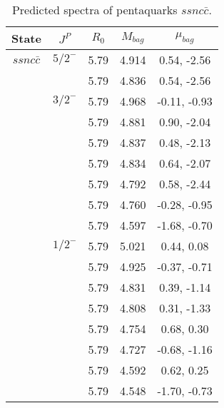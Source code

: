 \documentclass[prd,twocolumn,floatfix,nofootinbib]{revtex4}
\begin{document}
\renewcommand{\tabcolsep}{0.5cm}
\renewcommand{\arraystretch}{1.2}
\begin{table*}[!htbp]
    \caption{Predicted spectra of pentaquarks $ssnc\bar{c}$.}
    \begin{tabular}{ccccc}
        \hline\hline
        {\rm State} &$J^{P}$ &$R_{0}$ &$M_{bag}$ &$\mu_{bag}$ \\ \hline
        $ssnc\bar{c}$
            &${5/2}^{-}$    &5.79   &4.914 &0.54, -2.56\\
            &               &5.79   &4.836 &0.54, -2.56  \\
            &${3/2}^{-}$    &5.79   &4.968 &-0.11, -0.93  \\
            &               &5.79   &4.881 &0.90, -2.04  \\
            &               &5.79   &4.837 &0.48, -2.13  \\
            &               &5.79   &4.834 &0.64, -2.07  \\
            &               &5.79   &4.792 &0.58, -2.44  \\
            &               &5.79   &4.760 &-0.28, -0.95  \\
            &               &5.79   &4.597 &-1.68, -0.70  \\
            &${1/2}^{-}$    &5.79   &5.021 &0.44, 0.08  \\
            &               &5.79   &4.925 &-0.37, -0.71  \\
            &               &5.79   &4.831 &0.39, -1.14  \\
            &               &5.79   &4.808 &0.31, -1.33  \\
            &               &5.79   &4.754 &0.68, 0.30  \\
            &               &5.79   &4.727 &-0.68, -1.16  \\
            &               &5.79   &4.592 &0.62, 0.25  \\
            &               &5.79   &4.548 &-1.70, -0.73  \\
        \hline\hline
    \end{tabular}
\end{table*}
\end{document}
